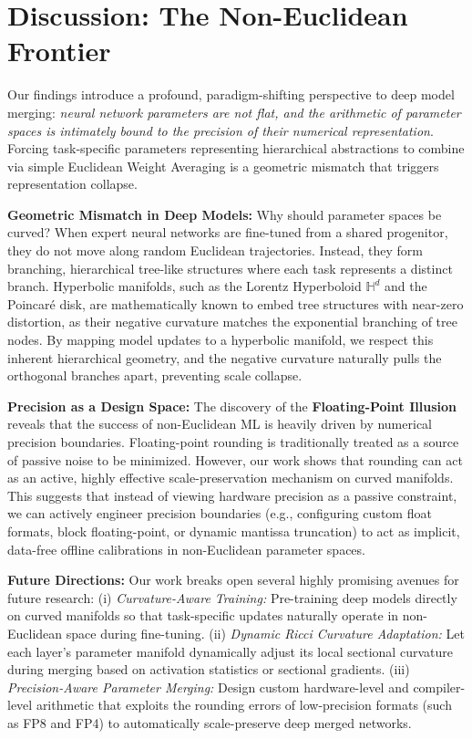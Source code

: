 \documentclass{article}
\theoremstyle{plain}
\theoremstyle{definition}
\theoremstyle{remark}
\begin{document}
\section{Discussion: The Non-Euclidean Frontier}
\label{sec:discussion}
Our findings introduce a profound, paradigm-shifting perspective to deep model merging: \textit{neural network parameters are not flat, and the arithmetic of parameter spaces is intimately bound to the precision of their numerical representation}. Forcing task-specific parameters representing hierarchical abstractions to combine via simple Euclidean Weight Averaging is a geometric mismatch that triggers representation collapse.

\textbf{Geometric Mismatch in Deep Models:}
Why should parameter spaces be curved? When expert neural networks are fine-tuned from a shared progenitor, they do not move along random Euclidean trajectories. Instead, they form branching, hierarchical tree-like structures where each task represents a distinct branch. Hyperbolic manifolds, such as the Lorentz Hyperboloid $\mathbb{H}^d$ and the Poincaré disk, are mathematically known to embed tree structures with near-zero distortion, as their negative curvature matches the exponential branching of tree nodes. By mapping model updates to a hyperbolic manifold, we respect this inherent hierarchical geometry, and the negative curvature naturally pulls the orthogonal branches apart, preventing scale collapse.

\textbf{Precision as a Design Space:}
The discovery of the \textbf{Floating-Point Illusion} reveals that the success of non-Euclidean ML is heavily driven by numerical precision boundaries. Floating-point rounding is traditionally treated as a source of passive noise to be minimized. However, our work shows that rounding can act as an active, highly effective scale-preservation mechanism on curved manifolds. This suggests that instead of viewing hardware precision as a passive constraint, we can actively engineer precision boundaries (e.g., configuring custom float formats, block floating-point, or dynamic mantissa truncation) to act as implicit, data-free offline calibrations in non-Euclidean parameter spaces.

\textbf{Future Directions:}
Our work breaks open several highly promising avenues for future research: (i) \textit{Curvature-Aware Training:} Pre-training deep models directly on curved manifolds so that task-specific updates naturally operate in non-Euclidean space during fine-tuning. (ii) \textit{Dynamic Ricci Curvature Adaptation:} Let each layer's parameter manifold dynamically adjust its local sectional curvature during merging based on activation statistics or sectional gradients. (iii) \textit{Precision-Aware Parameter Merging:} Design custom hardware-level and compiler-level arithmetic that exploits the rounding errors of low-precision formats (such as FP8 and FP4) to automatically scale-preserve deep merged networks.
\end{document}
